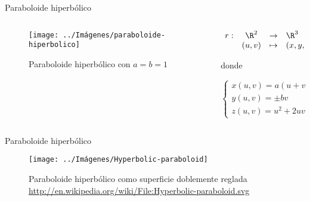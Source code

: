 \documentclass[10pt]{beamer}
\begin{document}
	\begin{frame}{Paraboloide hiperbólico}
		\begin{columns}[t] %
			\begin{column}{.50\textwidth}
				\begin{figure}
					\centering
					\texttt{[image: ../Imágenes/paraboloide-hiperbolico]}
					\caption{Paraboloide hiperbólico con $a = b = 1$}
					\label{fig:paraboloide-hiperbolico}
				\end{figure}
			\end{column}%
			\hfill%
			\begin{column}{.50\textwidth}
				$$\begin{array}{rcll}
				r : & \R^2 & \to & \R^3\\
				& (u,v) & \mapsto & (x,y,z)
				\end{array}$$
				
				donde 
				
				$$ \begin{cases}
				x(u,v) = a(u+v) \\
				y(u,v) = \pm bv \\
				z(u,v) = u^2 +2uv
				\end{cases} $$
			\end{column}%
		\end{columns}
	\end{frame}
	
	\begin{frame}{Paraboloide hiperbólico}
		\begin{figure}
			\centering
			\texttt{[image: ../Imágenes/Hyperbolic-paraboloid]}
			\caption{Paraboloide hiperbólico como superficie doblemente reglada \url{http://en.wikipedia.org/wiki/File:Hyperbolic-paraboloid.svg}}
			\label{fig:Paraboloide hiperbólico-2}
		\end{figure}	
	\end{frame}
	
\end{document}

